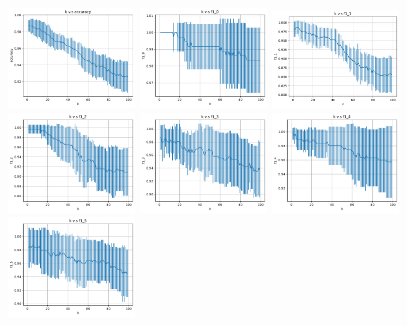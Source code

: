 \begin{figure}
    \centering
    \includegraphics[width=0.30\textwidth]{figures/mnist_knn_accuracy.pdf}
    \includegraphics[width=0.30\textwidth]{figures/mnist_knn_f1_0.pdf}
    \includegraphics[width=0.30\textwidth]{figures/mnist_knn_f1_1.pdf}
    \includegraphics[width=0.30\textwidth]{figures/mnist_knn_f1_2.pdf}
    \includegraphics[width=0.30\textwidth]{figures/mnist_knn_f1_3.pdf}
    \includegraphics[width=0.30\textwidth]{figures/mnist_knn_f1_4.pdf}
    \includegraphics[width=0.30\textwidth]{figures/mnist_knn_f1_5.pdf}

\end{figure}
